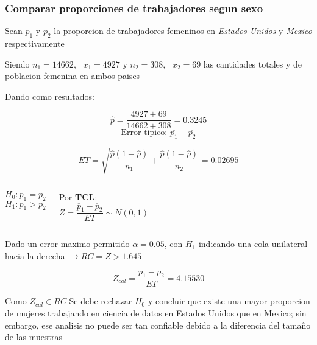 \documentclass{beamer}
\begin{document}
\begin{frame}
  \frametitle{Comparar proporciones de trabajadores segun sexo}
  Sean $p_1 \textrm{ y } p_2$ la proporcion de trabajadores femeninos en \textit{Estados Unidos}
  y \textit{Mexico} respectivamente

  Siendo $n_1 = 14662,\textrm{ } x_1 = 4927 \textrm{ y } n_2 = 308, \textrm{ } x_2 = 69$ las cantidades totales
  y de poblacion femenina en ambos paises

  Dando como resultados:

  \[
    \hat{p} = \frac{4927 + 69}{14662 + 308} = 0.3245 \]
  \[
    \textrm{Error tipico: } \overline{p_1} - \overline{p_2}
  \]

  \[
    ET = \sqrt{\frac{\hat{p}(1 - \hat{p})}{n_1} + \frac{\hat{p}(1 - \hat{p})}{n_2}} = 0.02695
  \]

\end{frame}

\begin{frame}

  \begin{columns}
   \[H_0: p_1 = p_2\]
   \[H_1: p_1 > p_2\]


    Por \textbf{TCL}:
      \[\textit{Z} = \frac{\overline{p}_1 - \overline{p}_2}{ET} \sim N(0, 1)\]
      \newline

  \end{columns}

  Dado un error maximo permitido $\alpha = 0.05$, con \textit{$H_1$} indicando una cola unilateral
  hacia la derecha $\rightarrow RC = {Z > 1.645}$

  \[Z_{cal} = \frac{p_1 - p_2}{ET} = 4.15530\]

  Como \textit{$Z_{cal} \in RC$} Se debe rechazar \textit{$H_0$} y concluir que
  existe una mayor proporcion de mujeres trabajando en ciencia de datos en Estados
  Unidos que en Mexico; sin embargo, ese analisis no puede ser tan confiable debido
  a la diferencia del tamaño de las muestras

\end{frame}
\end{document}
